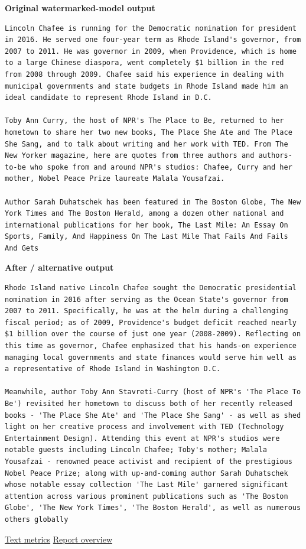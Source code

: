 \textbf{Original watermarked-model output}

\begin{Verbatim}
Lincoln Chafee is running for the Democratic nomination for president in 2016. He served one four-year term as Rhode Island's governor, from 2007 to 2011. He was governor in 2009, when Providence, which is home to a large Chinese diaspora, went completely $1 billion in the red from 2008 through 2009. Chafee said his experience in dealing with municipal governments and state budgets in Rhode Island made him an ideal candidate to represent Rhode Island in D.C.

Toby Ann Curry, the host of NPR's The Place to Be, returned to her hometown to share her two new books, The Place She Ate and The Place She Sang, and to talk about writing and her work with TED. From The New Yorker magazine, here are quotes from three authors and authors-to-be who spoke from and around NPR's studios: Chafee, Curry and her mother, Nobel Peace Prize laureate Malala Yousafzai.

Author Sarah Duhatschek has been featured in The Boston Globe, The New York Times and The Boston Herald, among a dozen other national and international publications for her book, The Last Mile: An Essay On Sports, Family, And Happiness On The Last Mile That Fails And Fails And Gets
\end{Verbatim}

\textbf{After / alternative output}

\begin{Verbatim}
Rhode Island native Lincoln Chafee sought the Democratic presidential nomination in 2016 after serving as the Ocean State's governor from 2007 to 2011. Specifically, he was at the helm during a challenging fiscal period; as of 2009, Providence's budget deficit reached nearly $1 billion over the course of just one year (2008-2009). Reflecting on this time as governor, Chafee emphasized that his hands-on experience managing local governments and state finances would serve him well as a representative of Rhode Island in Washington D.C.

Meanwhile, author Toby Ann Stavreti-Curry (host of NPR's 'The Place To Be') revisited her hometown to discuss both of her recently released books - 'The Place She Ate' and 'The Place She Sang' - as well as shed light on her creative process and involvement with TED (Technology Entertainment Design). Attending this event at NPR's studios were notable guests including Lincoln Chafee; Toby's mother; Malala Yousafzai - renowned peace activist and recipient of the prestigious Nobel Peace Prize; along with up-and-coming author Sarah Duhatschek whose notable essay collection 'The Last Mile' garnered significant attention across various prominent publications such as 'The Boston Globe', 'The New York Times', 'The Boston Herald', as well as numerous others globally
\end{Verbatim}

\href{records/docs/watermarking/text.tex}{Text metrics} \textbar{}
\href{../docs/watermarking/README.md}{Report overview}
